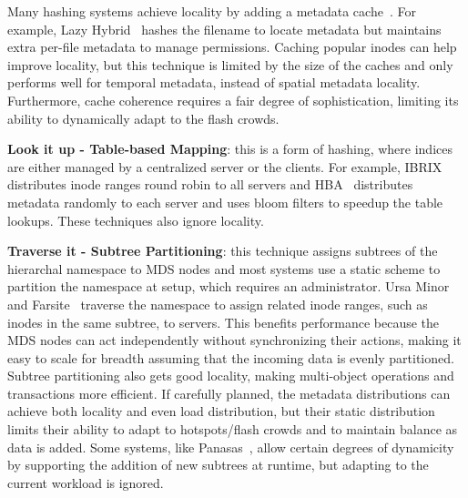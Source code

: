 Many hashing systems achieve locality by adding a metadata cache~\cite{li:msst2006-dynamic, xing:sc2009-skyfs,zhu:pds2008-hba}. For example, Lazy Hybrid~\cite{brandt:mss2003-lh} hashes the filename to locate metadata but maintains extra per-file metadata to manage permissions. Caching popular inodes can help improve locality, but this technique is limited by the size of the caches and only performs well for temporal metadata, instead of spatial metadata locality. Furthermore, cache coherence requires a fair degree of sophistication, limiting its ability to dynamically adapt to the flash crowds.

\textbf{Look it up - Table-based Mapping}: this is a form of hashing, where indices are either managed by a centralized server or the clients. For example, IBRIX~\cite{hp:whitepaper2012-storeall} distributes inode ranges round robin to all servers and HBA~\cite{zhu:pds2008-hba} distributes metadata randomly to each server and uses bloom filters to speedup the table lookups. These techniques also ignore locality.

\textbf{Traverse it - Subtree Partitioning}: this technique assigns subtrees of the hierarchal namespace to MDS nodes and most systems use a static scheme to partition the namespace at setup, which requires an administrator. Ursa Minor~\cite{sinnamohideen:atc2010-ursa} and Farsite~\cite{doucer:osdi2006-farsite-dir} traverse the namespace to assign related inode ranges, such as inodes in the same subtree, to servers. This benefits performance because the MDS nodes can act independently without synchronizing their actions, making it easy to scale for breadth assuming that the incoming data is evenly partitioned.  Subtree partitioning also gets good locality, making multi-object operations and transactions more efficient. If carefully planned, the metadata distributions can achieve both locality and even load distribution, but their static distribution limits their ability to adapt to hotspots/flash crowds and to maintain balance as data is added.  Some systems, like Panasas~\cite{welch:fast2008-panasas}, allow certain degrees of dynamicity by supporting the addition of new subtrees at runtime, but adapting to the current workload is ignored. 



